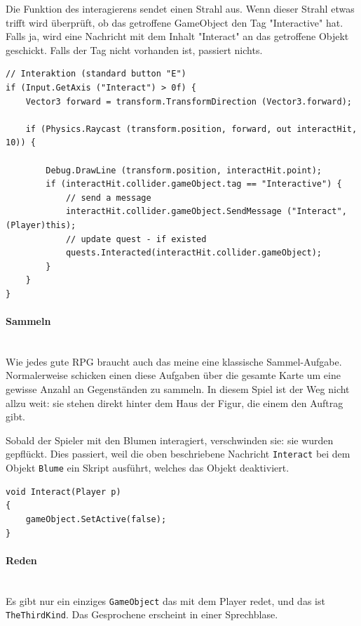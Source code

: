 Die Funktion des interagierens sendet einen Strahl aus.
Wenn dieser Strahl etwas trifft wird überprüft, ob das getroffene GameObject den Tag "Interactive" hat. Falls ja, wird eine Nachricht mit dem Inhalt "Interact" an das getroffene Objekt geschickt. Falls der Tag nicht vorhanden ist, passiert nichts.

\begin{lstlisting}[caption={Auslösen der Interaktion}]
// Interaktion (standard button "E")
if (Input.GetAxis ("Interact") > 0f) {
	Vector3 forward = transform.TransformDirection (Vector3.forward);

	if (Physics.Raycast (transform.position, forward, out interactHit, 10)) {	
		
		Debug.DrawLine (transform.position, interactHit.point);
		if (interactHit.collider.gameObject.tag == "Interactive") {
			// send a message
			interactHit.collider.gameObject.SendMessage ("Interact", (Player)this);
			// update quest - if existed
			quests.Interacted(interactHit.collider.gameObject);
		}
	}	
}
\end{lstlisting}

\paragraph{Sammeln}\mbox{} \\
Wie jedes gute RPG braucht auch das meine eine klassische Sammel-Aufgabe.
Normalerweise schicken einen diese Aufgaben über die gesamte Karte um eine gewisse Anzahl an Gegenständen zu sammeln.
In diesem Spiel ist der Weg nicht allzu weit: sie stehen direkt hinter dem Haus der Figur, die einem den Auftrag gibt.

Sobald der Spieler mit den Blumen interagiert, verschwinden sie: sie wurden gepflückt.
Dies passiert, weil die oben beschriebene Nachricht \lstinline{Interact} bei dem Objekt \lstinline{Blume} ein Skript ausführt, welches das Objekt deaktiviert.
\begin{lstlisting}[caption={Standardimplementation von Interact}]
void Interact(Player p)
{
	gameObject.SetActive(false);
}
\end{lstlisting}
 
\paragraph{Reden}\mbox{} \\
Es gibt nur ein einziges \lstinline{GameObject} das mit dem Player redet, und das ist \lstinline{TheThirdKind}.
 Das Gesprochene erscheint in einer Sprechblase.
 
